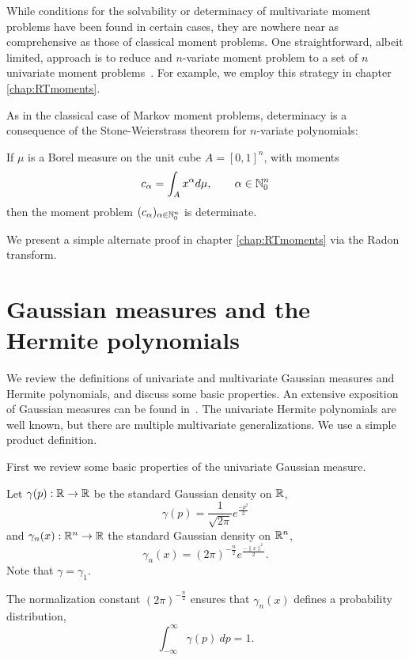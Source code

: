 While conditions for the solvability or determinacy of multivariate moment problems have been found in certain cases, they are nowhere near as comprehensive as those of classical moment problems. One straightforward, albeit limited, approach is to reduce and $n$-variate moment problem to a set of $n$ univariate moment problems~\cite{Pete82}. For example, we employ this strategy in chapter \ref{chap:RTmoments}.

As in the classical case of Markov moment problems, determinacy is a consequence of the Stone-Weierstrass theorem for $n$-variate polynomials:
\begin{proposition}
  If $\mu$ is a Borel measure on the unit cube $A = {[0,1]}^n$, with moments
  \[
    c_\alpha = \int_{A} x^\alpha d\mu, \qquad \alpha \in \mathbb{N}_0^n
  \]
  then the moment problem $(c_\alpha)_{\alpha \in \mathbb{N}_0^n}$ is determinate.
\end{proposition}
We present a simple alternate proof in chapter \ref{chap:RTmoments} via the Radon transform.


\section{Gaussian measures and the Hermite polynomials}\label{sec:gaussian}
We review the definitions of univariate and multivariate Gaussian measures and Hermite polynomials, and discuss some basic properties. An extensive exposition of Gaussian measures can be found in~\cite{bogachev_gaussian_1998}. The univariate Hermite polynomials are well known, but there are multiple multivariate generalizations. We use a simple product definition.

First we review some basic properties of the univariate Gaussian measure.

\begin{definition}
  Let $\gamma(p) : \mathbb{R} \rightarrow \mathbb{R}$  be the standard Gaussian density on $\mathbb{R}$,
  \[
    \gamma(p) = \frac1{\sqrt{2\pi}} e^{\frac{-p^2}2}
  \]
  and $\gamma_n(x) : \mathbb{R}^n \rightarrow \mathbb{R}$ the standard Gaussian density on $\mathbb{R}^n$,
  \[
    \gamma_n(x) = {(2\pi)}^{-\frac n2} e^{\frac{-\|x\|^2}2}.
  \]
  Note that $\gamma = \gamma_1$.
\end{definition}

The normalization constant $(2\pi)^{-\frac{n}2}$ ensures that $\gamma_n(x)$ defines a probability distribution,
\[
  \int_{-\infty}^\infty \gamma(p) ~dp = 1.
\]

